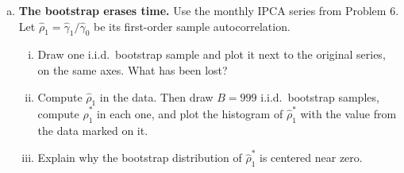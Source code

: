 \documentclass[11pt]{article}
\theoremstyle{definition}
\begin{document}
\begin{enumerate}[a)]
	As in Lecture 2, estimate the bootstrap quantiles using the empirical cdf $L_T$ of the $B$ simulated bootstrap roots. Use the same procedure for the block bootstrap below.

	\textit{Hint}: draw $y_1$ from the stationary distribution, $N\left(\nu, \sigma^2/(1-\phi_1^2)\right)$, and generate the rest of the path recursively. Why does this matter?

	\item \textbf{The bootstrap erases time.} Use the monthly IPCA series from Problem 6. Let $\hat{\rho}_1 = \hat{\gamma}_1/\hat{\gamma}_0$ be its first-order sample autocorrelation.
	\begin{enumerate}[(i)]
		\item Draw one i.i.d.\ bootstrap sample and plot it next to the original series, on the same axes. What has been lost?
		\item Compute $\hat{\rho}_1$ in the data. Then draw $B = 999$ i.i.d.\ bootstrap samples, compute $\hat{\rho}^*_1$ in each one, and plot the histogram of $\hat{\rho}^*_1$ with the value from the data marked on it.
		\item Explain why the bootstrap distribution of $\hat{\rho}^*_1$ is centered near zero.
	\end{enumerate}


\end{enumerate}
\end{document}
